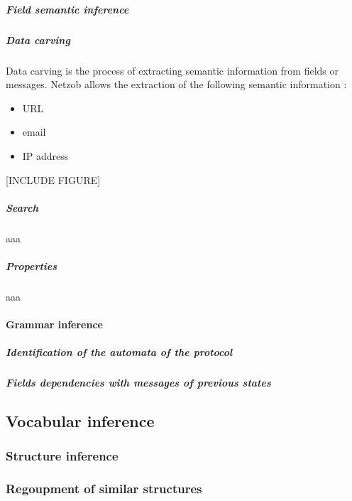 \documentclass[letterpaper,10pt,english]{sphinxmanual}
\begin{document}
\subparagraph{Field semantic inference}
\label{modelization/vocabular:field-semantic-inference}

\subparagraph{Data carving}
\label{modelization/vocabular:data-carving}
Data carving is the process of extracting semantic information from fields or messages. Netzob allows the extraction of the following semantic information :
\begin{itemize}
\item {} 
URL

\item {} 
email

\item {} 
IP address

\end{itemize}

{[}INCLUDE FIGURE{]}


\subparagraph{Search}
\label{modelization/vocabular:search}
aaa


\subparagraph{Properties}
\label{modelization/vocabular:properties}
aaa


\paragraph{Grammar inference}
\label{modelization/grammar:grammar-inference}\label{modelization/grammar:grammar}\label{modelization/grammar::doc}

\subparagraph{Identification of the automata of the protocol}
\label{modelization/grammar:identification-of-the-automata-of-the-protocol}

\subparagraph{Fields dependencies with messages of previous states}
\label{modelization/grammar:fields-dependencies-with-messages-of-previous-states}

\subsection{Vocabular inference}
\label{modelization/vocabular::doc}\label{modelization/vocabular:vocabular-inference}\label{modelization/vocabular:vocabular}

\subsubsection{Structure inference}
\label{modelization/vocabular:structure-inference}

\subsubsection{Regoupment of similar structures}
\label{modelization/vocabular:regoupment-of-similar-structures}
\end{document}
